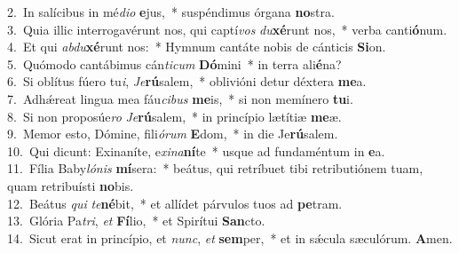 {2.~}In salícibus in mé\textit{di}\textit{o} \textbf{e}jus,~* suspéndimus órgana \textbf{no}stra.\\
{3.~}Quia illic interrogavérunt nos, qui captí\textit{vos} \textit{du}\textbf{xé}runt nos,~* verba canti\textbf{ó}num.\\
{4.~}Et qui \textit{ab}\textit{du}\textbf{xé}runt nos:~* Hymnum cantáte nobis de cánticis \textbf{Si}on.\\
{5.~}Quómodo cantábimus cán\textit{ti}\textit{cum} \textbf{Dó}mini~* in terra ali\textbf{é}na?\\
{6.~}Si oblítus fúero tu\textit{i}, \textit{Je}\textbf{rú}salem,~* oblivióni detur déxtera \textbf{me}a.\\
{7.~}Adhǽreat lingua mea fáu\textit{ci}\textit{bus} \textbf{me}is,~* si non memínero \textbf{tu}i.\\
{8.~}Si non proposúe\textit{ro} \textit{Je}\textbf{rú}salem,~* in princípio lætítiæ \textbf{me}æ.\\
{9.~}Memor esto, Dómine, fili\textit{ó}\textit{rum} \textbf{E}dom,~* in die Je\textbf{rú}salem.\\
{10.~}Qui dicunt: Exinaníte, e\textit{xi}\textit{na}\textbf{ní}te~* usque ad fundaméntum in \textbf{e}a.\\
{11.~}Fília Baby\textit{ló}\textit{nis} \textbf{mí}sera:~* beátus, qui retríbuet tibi retributiónem tuam, quam retribuísti \textbf{no}bis.\\
{12.~}Beátus \textit{qui} \textit{te}\textbf{né}bit,~* et allídet párvulos tuos ad \textbf{pe}tram.\\
{13.~}Glória Pa\textit{tri}, \textit{et} \textbf{Fí}lio,~* et Spirítui \textbf{San}cto.\\
{14.~}Sicut erat in princípio, et \textit{nunc}, \textit{et} \textbf{sem}per,~* et in sǽcula sæculórum. \textbf{A}men.\\
